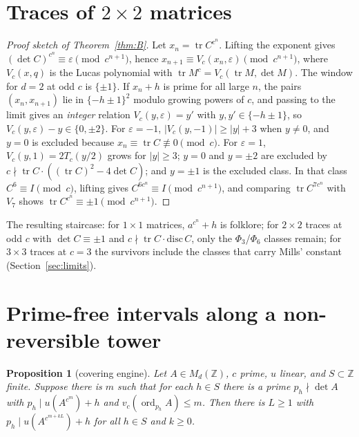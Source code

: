 \documentclass[11pt]{amsart}
\newtheorem{proposition}[theorem]{Proposition}
\theoremstyle{definition}
\newcommand{\Z}{\mathbb{Z}}
\newcommand{\tr}{\operatorname{tr}}
\newcommand{\ord}{\operatorname{ord}}
\begin{document}
\section{Traces of $2\times2$ matrices}\label{sec:traces}

\begin{proof}[Proof sketch of Theorem~\ref{thm:B}]
Let $x_n=\tr C^{c^n}$.  Lifting the exponent gives $(\det C)^{c^n}\equiv\varepsilon\pmod{c^{n+1}}$, hence $x_{n+1}\equiv V_c(x_n,\varepsilon)\pmod{c^{n+1}}$, where $V_c(x,q)$ is the Lucas polynomial with $\tr M^c=V_c(\tr M,\det M)$.  The window for $d=2$ at odd $c$ is $\{\pm1\}$.  If $x_n+h$ is prime for all large $n$, the pairs $(x_n,x_{n+1})$ lie in $\{-h\pm1\}^2$ modulo growing powers of $c$, and passing to the limit gives an \emph{integer} relation $V_c(y,\varepsilon)=y'$ with $y,y'\in\{-h\pm1\}$, so $V_c(y,\varepsilon)-y\in\{0,\pm2\}$.  For $\varepsilon=-1$, $|V_c(y,-1)|\ge|y|+3$ when $y\neq0$, and $y=0$ is excluded because $x_n\equiv\tr C\not\equiv0\pmod c$.  For $\varepsilon=1$, $V_c(y,1)=2T_c(y/2)$ grows for $|y|\ge3$; $y=0$ and $y=\pm2$ are excluded by $c\nmid\tr C\cdot((\tr C)^2-4\det C)$; and $y=\pm1$ is the excluded class.  In that class $C^6\equiv I\pmod c$, lifting gives $C^{6c^n}\equiv I\pmod{c^{n+1}}$, and comparing $\tr C^{7c^n}$ with $V_7$ shows $\tr C^{c^n}\equiv\pm1\pmod{c^{n+1}}$.
\end{proof}

The resulting staircase: for $1\times1$ matrices, $a^{c^n}+h$ is folklore; for $2\times2$ traces at odd $c$ with $\det C\equiv\pm1$ and $c\nmid\tr C\cdot\mathrm{disc}\,C$, only the $\Phi_3$/$\Phi_6$ classes remain; for $3\times3$ traces at $c=3$ the survivors include the classes that carry Mills' constant (Section~\ref{sec:limits}).

\section{Prime-free intervals along a non-reversible tower}\label{sec:intervals}

\begin{proposition}[covering engine]\label{prop:engine}
Let $A\in M_d(\Z)$, $c$ prime, $u$ linear, and $S\subset\Z$ finite.  Suppose there is $m$ such that for each $h\in S$ there is a prime $p_h\nmid\det A$ with $p_h\mid u(A^{c^{m}})+h$ and $v_c(\ord_{p_h}A)\le m$.  Then there is $L\ge1$ with $p_h\mid u(A^{c^{m+kL}})+h$ for all $h\in S$ and $k\ge0$.
\end{proposition}
\end{document}
